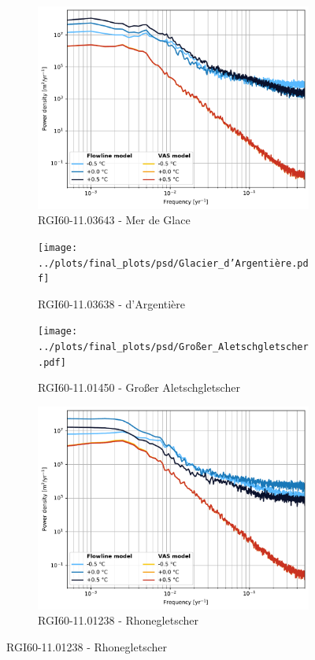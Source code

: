 \begin{figure}[htp]
\begin{subfigure}[b]{0.48\textwidth}
        \end{subfigure}
        \begin{subfigure}[b]{0.48\textwidth}
          \caption{RGI60-11.03643 - Mer de Glace}
          \label{fig:psd:mer_de_glace}
          \centering
          \includegraphics[width=\textwidth]{../plots/final_plots/psd/Mer_de_Glace.pdf}
        \end{subfigure}
        \hfill
        \begin{subfigure}[b]{0.48\textwidth}
          \caption{RGI60-11.03638 - d'Argentière}
          \label{fig:psd:glacier_d_argentiere}
          \centering
          \texttt{[image: ../plots/final\_plots/psd/Glacier\_d'Argentière.pdf]}
        \end{subfigure}
        \begin{subfigure}[b]{0.48\textwidth}
          \caption{RGI60-11.01450 - Großer Aletschgletscher}
          \label{fig:psd:großer_aletschgletscher}
          \centering
          \texttt{[image: ../plots/final\_plots/psd/Großer\_Aletschgletscher.pdf]}
        \end{subfigure}
        \hfill
        \begin{subfigure}[b]{0.48\textwidth}
          \caption{RGI60-11.01238 - Rhonegletscher}
          \label{fig:psd:rhonegletscher}
          \centering
          \includegraphics[width=\textwidth]{../plots/final_plots/psd/Rhonegletscher.pdf}

\end{subfigure}
\end{figure}
